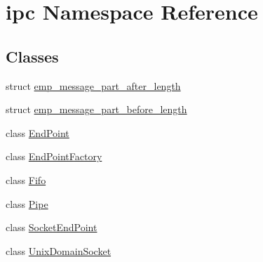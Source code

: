 \hypertarget{namespaceipc}{}\section{ipc Namespace Reference}
\label{namespaceipc}
\subsection*{Classes}
\begin{DoxyCompactItemize}
\item 
struct \hyperlink{structipc_1_1emp__message__part__after__length}{emp\+\_\+message\+\_\+part\+\_\+after\+\_\+length}
\item 
struct \hyperlink{structipc_1_1emp__message__part__before__length}{emp\+\_\+message\+\_\+part\+\_\+before\+\_\+length}
\item 
class \hyperlink{classipc_1_1EndPoint}{End\+Point}
\item 
class \hyperlink{classipc_1_1EndPointFactory}{End\+Point\+Factory}
\item 
class \hyperlink{classipc_1_1Fifo}{Fifo}
\item 
class \hyperlink{classipc_1_1Pipe}{Pipe}
\item 
class \hyperlink{classipc_1_1SocketEndPoint}{Socket\+End\+Point}
\item 
class \hyperlink{classipc_1_1UnixDomainSocket}{Unix\+Domain\+Socket}
\end{DoxyCompactItemize}
